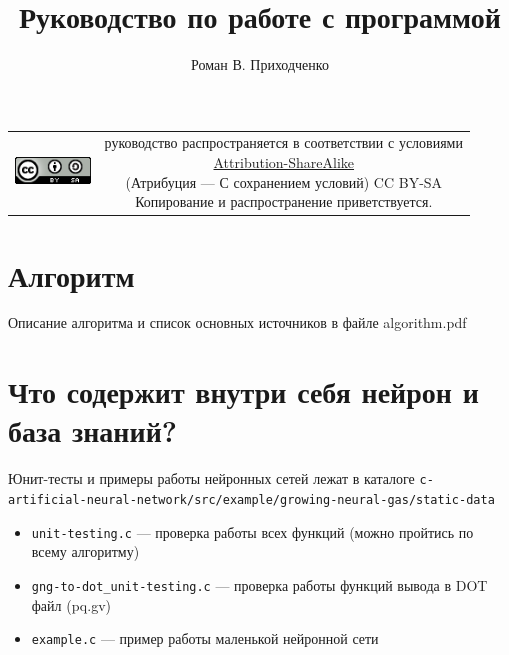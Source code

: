 \documentclass[unicode, 12pt, a4paper,oneside,fleqn]{article}
\author{Роман В. Приходченко}
\title{Руководство по работе с программой}
\begin{document}
\renewcommand\bibname{СПИСОК ЛИТЕРАТУРЫ}
\renewcommand\refname{\centering Список литературы}
\renewcommand\contentsname{\centering Содержание}



\makeatletter %
\maketitle

\begin{table}[ht]
  \begin{tabular}{cc}
    \includegraphics[width=2cm]{../../../CC_BY-SA_88x31.png} &
    \shortstack{руководство распространяется в соответствии с
      условиями\\
      \href{http://creativecommons.org/licenses/by-sa/3.0/}{Attribution-ShareAlike} \\
      (Атрибуция — С сохранением условий) CC BY-SA \\
      Копирование и распространение приветствуется.}
  \end{tabular}
\end{table}

\newpage
\tableofcontents

\section{Алгоритм}
Описание алгоритма и список основных источников в файле algorithm.pdf


\clearpage
\section{Что содержит внутри себя нейрон и база знаний?}

Юнит-тесты и примеры работы нейронных сетей лежат в каталоге
\verb'c-artificial-neural-network/src/example/growing-neural-gas/static-data'
\begin{itemize}
\item \verb'unit-testing.c' --- проверка работы всех функций (можно
  пройтись по всему алгоритму)
\item \verb'gng-to-dot_unit-testing.c' --- проверка работы функций
  вывода в DOT файл (pq.gv)
\item \verb'example.c' --- пример работы маленькой нейронной сети
\end{itemize}
\end{document}
